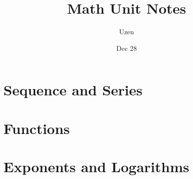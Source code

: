 \documentclass{report}
\title{Math Unit Notes}
\author{Uzen}
\date{Dec 28}
\begin{document}
\maketitle
\tableofcontents

\chapter{Sequence and Series}


\chapter{Functions}


\chapter{Exponents and Logarithms}

\end{document}
